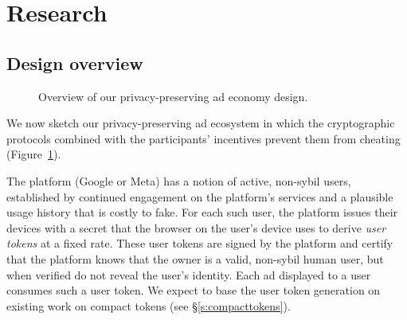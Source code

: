 \section{Research}
\label{r:stuff}

\subsection{Design overview}
\label{s:design}
%
%
%
%

\begin{figure}
 \centering
 \caption{Overview of our privacy-preserving ad economy design.}
 \label{f:overview}
\end{figure}

%
We now sketch our privacy-preserving ad ecosystem in which the cryptographic protocols combined with the participants' incentives prevent them from cheating (Figure~\ref{f:overview}).
%

%
The platform (\eg Google or Meta) has a notion of active, non-sybil users, established \eg by continued engagement on the platform's services and a plausible usage history that is costly to fake.
%
For each such user, the platform issues their devices with a secret that the browser on the user's device uses to derive \emph{user tokens} at a fixed rate.
%
These user tokens are signed by the platform and certify that the platform knows that the owner is a valid, non-sybil human user, but when verified do not reveal the user's identity.
%
Each ad displayed to a user consumes such a user token.
%
We expect to base the user token generation on existing work on compact tokens (see \S\ref{s:compacttokens}).
%

